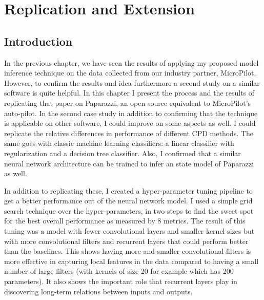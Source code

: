 \chapter{Replication and Extension}

\section{Introduction}

In the previous chapter, we have seen the results of applying my proposed model inference technique on the data collected from our industry partner, MicroPilot. However, to confirm the results and idea furthermore a second study on a similar software is quite helpful. 
In this chapter I present the process and the results of replicating that paper on Paparazzi, an open source equivalent to MicroPilot's auto-pilot.
In the second case study in addition to confirming that the technique is applicable on other software, I could improve on some aspects as well.
I could replicate the relative differences in performance of different CPD methods. The same goes with classic machine learning classifiers: a linear classifier with regularization and a decision tree classifier. 
Also, I confirmed that a similar neural network architecture can be trained to infer an state model of Paparazzi as well.

In addition to replicating these, I created a hyper-parameter tuning pipeline to get a better performance out of the neural network model. I used a simple grid search technique over the hyper-parameters, in two steps to find the sweet spot for the best overall performance as measured by 8 metrics.
The result of this tuning was a model with fewer convolutional layers and smaller kernel sizes but with more convolutional filters and recurrent layers that could perform better than the baselines. This shows having more and smaller convolutional filters is more effective in capturing local features in the data compared to having a small number of large filters (with kernels of size 20 for example which has 200 parameters). It also shows the important role that recurrent layers play in discovering long-term relations between inputs and outputs. 


